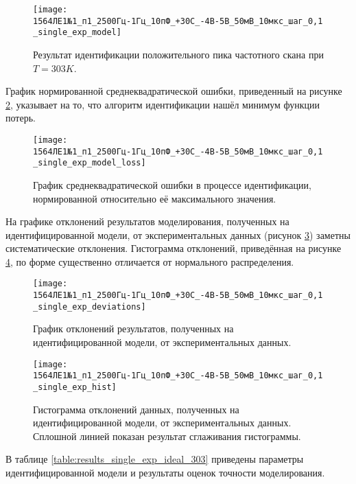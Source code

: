 	\begin{figure}[!htp]
		\centering
		\texttt{[image: 1564ЛЕ1№1\_п1\_2500Гц-1Гц\_10пФ\_+30С\_-4В-5В\_50мВ\_10мкс\_шаг\_0,1\_single\_exp\_model]}
		\caption{Результат идентификации положительного пика частотного скана
		         при $T=303K$.}
		\label{pic:model_single_exp_303}
	\end{figure}

	График нормированной среднеквадратической ошибки, приведенный на рисунке
	\ref{pic:loss_single_exp_303}, указывает на то, что алгоритм идентификации
	нашёл минимум функции потерь.

	\begin{figure}[!htp]
		\centering
		\texttt{[image: 1564ЛЕ1№1\_п1\_2500Гц-1Гц\_10пФ\_+30С\_-4В-5В\_50мВ\_10мкс\_шаг\_0,1\_single\_exp\_model\_loss]}
		\caption{График среднеквадратической ошибки в процессе идентификации,
		         нормированной относительно её максимального значения.}
		\label{pic:loss_single_exp_303}
	\end{figure}

	На графике отклонений результатов моделирования, полученных на идентифицированной
	модели, от экспериментальных данных (рисунок \ref{pic:deviations_single_exp_303})
	заметны систематические отклонения. Гистограмма отклонений, приведённая на 
	рисунке \ref{pic:hist_single_exp_303}, по форме существенно отличается от
	нормального распределения.

	\begin{figure}[!htp]
		\centering
		\texttt{[image: 1564ЛЕ1№1\_п1\_2500Гц-1Гц\_10пФ\_+30С\_-4В-5В\_50мВ\_10мкс\_шаг\_0,1\_single\_exp\_deviations]}
		\caption{График отклонений результатов, полученных на идентифицированной
		модели, от экспериментальных данных.}
		\label{pic:deviations_single_exp_303}
	\end{figure}

	\begin{figure}[!htp]
		\centering
		\texttt{[image: 1564ЛЕ1№1\_п1\_2500Гц-1Гц\_10пФ\_+30С\_-4В-5В\_50мВ\_10мкс\_шаг\_0,1\_single\_exp\_hist]}
		\caption{Гистограмма отклонений данных, полученных на идентифицированной 
		         модели, от экспериментальных данных. Сплошной линией показан
		         результат сглаживания гистограммы.}
		\label{pic:hist_single_exp_303}
	\end{figure}

	В таблице \ref{table:results_single_exp_ideal_303} приведены параметры 
	идентифицированной модели и результаты оценок точности моделирования.


